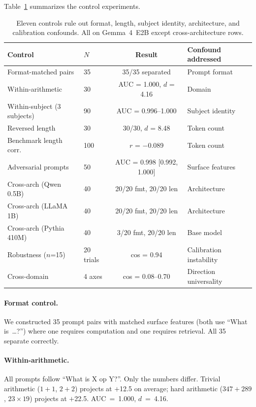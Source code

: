 \documentclass[11pt]{article}
\begin{document}
Table~\ref{tab:controls} summarizes the control experiments.

\begin{table}[t]
\caption{Eleven controls rule out format, length, subject identity, architecture, and calibration confounds. All on Gemma~4~E2B except cross-architecture rows.}
\label{tab:controls}
\vspace{4pt}
\centering
\small
\begin{tabular}{@{}llcl@{}}
\toprule
Control & $N$ & Result & Confound addressed \\
\midrule
Format-matched pairs & 35 & 35/35 separated & Prompt format \\
Within-arithmetic & 30 & AUC = 1.000, $d$ = 4.16 & Domain \\
Within-subject (3 subjects) & 90 & AUC = 0.996--1.000 & Subject identity \\
Reversed length & 30 & 30/30, $d$ = 8.48 & Token count \\
Benchmark length corr. & 100 & $r$ = $-$0.089 & Token count \\
Adversarial prompts & 50 & AUC = 0.998 [0.992, 1.000] & Surface features \\
Cross-arch (Qwen 0.5B) & 40 & 20/20 fmt, 20/20 len & Architecture \\
Cross-arch (LLaMA 1B) & 40 & 20/20 fmt, 20/20 len & Architecture \\
Cross-arch (Pythia 410M) & 40 & 3/20 fmt, 20/20 len & Base model \\
Robustness ($n$=15) & 20 trials & cos = 0.94 & Calibration instability \\
Cross-domain & 4 axes & cos = 0.08--0.70 & Direction universality \\
\bottomrule
\end{tabular}
\end{table}

\paragraph{Format control.} We constructed 35 prompt pairs with matched surface features (both use ``What is~\ldots?'') where one requires computation and one requires retrieval. All 35 separate correctly.

\paragraph{Within-arithmetic.} All prompts follow ``What is X op Y?''. Only the numbers differ. Trivial arithmetic ($1+1$, $2+2$) projects at $+$12.5 on average; hard arithmetic ($347+289$, $23\times19$) projects at $+$22.5. AUC~=~1.000, $d$~=~4.16.
\end{document}

